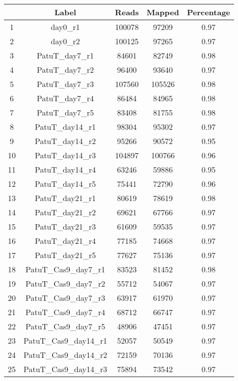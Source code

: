 \documentclass{article}
\begin{document}
\begin{table}[ht]
\centering
\begin{tabular}{ccccc}
  \hline
 & Label & Reads & Mapped & Percentage \\ 
  \hline
1 & day0\_r1 & 100078 & 97209 & 0.97 \\ 
  2 & day0\_r2 & 100125 & 97265 & 0.97 \\ 
  3 & PatuT\_day7\_r1 & 84601 & 82749 & 0.98 \\ 
  4 & PatuT\_day7\_r2 & 96400 & 93640 & 0.97 \\ 
  5 & PatuT\_day7\_r3 & 107560 & 105526 & 0.98 \\ 
  6 & PatuT\_day7\_r4 & 86484 & 84965 & 0.98 \\ 
  7 & PatuT\_day7\_r5 & 83408 & 81755 & 0.98 \\ 
  8 & PatuT\_day14\_r1 & 98304 & 95302 & 0.97 \\ 
  9 & PatuT\_day14\_r2 & 95266 & 90572 & 0.95 \\ 
  10 & PatuT\_day14\_r3 & 104897 & 100766 & 0.96 \\ 
  11 & PatuT\_day14\_r4 & 63246 & 59886 & 0.95 \\ 
  12 & PatuT\_day14\_r5 & 75441 & 72790 & 0.96 \\ 
  13 & PatuT\_day21\_r1 & 80619 & 78619 & 0.98 \\ 
  14 & PatuT\_day21\_r2 & 69621 & 67766 & 0.97 \\ 
  15 & PatuT\_day21\_r3 & 61609 & 59535 & 0.97 \\ 
  16 & PatuT\_day21\_r4 & 77185 & 74668 & 0.97 \\ 
  17 & PatuT\_day21\_r5 & 77627 & 75136 & 0.97 \\ 
  18 & PatuT\_Cas9\_day7\_r1 & 83523 & 81452 & 0.98 \\ 
  19 & PatuT\_Cas9\_day7\_r2 & 55712 & 54067 & 0.97 \\ 
  20 & PatuT\_Cas9\_day7\_r3 & 63917 & 61970 & 0.97 \\ 
  21 & PatuT\_Cas9\_day7\_r4 & 68712 & 66747 & 0.97 \\ 
  22 & PatuT\_Cas9\_day7\_r5 & 48906 & 47451 & 0.97 \\ 
  23 & PatuT\_Cas9\_day14\_r1 & 52057 & 50549 & 0.97 \\ 
  24 & PatuT\_Cas9\_day14\_r2 & 72159 & 70136 & 0.97 \\ 
  25 & PatuT\_Cas9\_day14\_r3 & 75894 & 73542 & 0.97 \\ 

\end{tabular}
\end{table}
\end{document}

